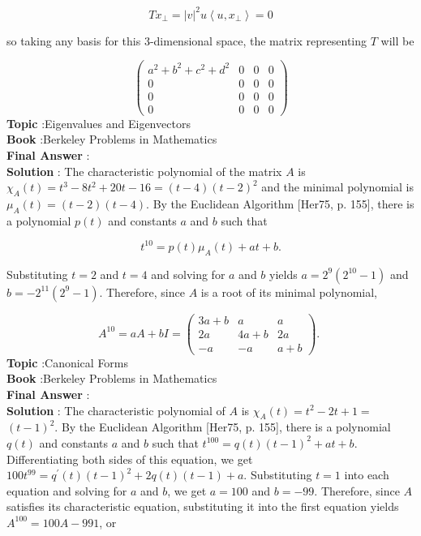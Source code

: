 \documentclass[10pt]{article}
\begin{document}
$$
T x_{\perp}=|v|^{2} u\left\langle u, x_{\perp}\right\rangle=0
$$

so taking any basis for this 3-dimensional space, the matrix representing $T$ will be

$$
\left(\begin{array}{cccc}
a^{2}+b^{2}+c^{2}+d^{2} & 0 & 0 & 0 \\
0 & 0 & 0 & 0 \\
0 & 0 & 0 & 0 \\
0 & 0 & 0 & 0
\end{array}\right)
$$
\textbf{Topic} :Eigenvalues and Eigenvectors \\
\textbf{Book} :Berkeley Problems in Mathematics\\
\textbf{Final Answer} :\\


\textbf{Solution} : The characteristic polynomial of the matrix $A$ is $\chi_{A}(t)=t^{3}-8 t^{2}+20 t-16=(t-4)(t-2)^{2}$ and the minimal polynomial is $\mu_{A}(t)=(t-2)(t-4)$. By the Euclidean Algorithm [Her75, p. 155], there is a polynomial $p(t)$ and constants $a$ and $b$ such that

$$
t^{10}=p(t) \mu_{A}(t)+a t+b .
$$

Substituting $t=2$ and $t=4$ and solving for $a$ and $b$ yields $a=2^{9}\left(2^{10}-1\right)$ and $b=-2^{11}\left(2^{9}-1\right)$. Therefore, since $A$ is a root of its minimal polynomial,

$$
A^{10}=a A+b I=\left(\begin{array}{ccc}
3 a+b & a & a \\
2 a & 4 a+b & 2 a \\
-a & -a & a+b
\end{array}\right) \text {. }
$$
\textbf{Topic} :Canonical Forms \\
\textbf{Book} :Berkeley Problems in Mathematics\\
\textbf{Final Answer} :\\


\textbf{Solution} : The characteristic polynomial of $A$ is $\chi_{A}(t)=t^{2}-2 t+1=$ $(t-1)^{2}$. By the Euclidean Algorithm [Her75, p. 155], there is a polynomial $q(t)$ and constants $a$ and $b$ such that $t^{100}=q(t)(t-1)^{2}+a t+b$. Differentiating both sides of this equation, we get $100 t^{99}=q^{\prime}(t)(t-1)^{2}+2 q(t)(t-1)+a$. Substituting $t=1$ into each equation and solving for $a$ and $b$, we get $a=100$ and $b=-99$. Therefore, since $A$ satisfies its characteristic equation, substituting it into the first equation yields $A^{100}=100 A-991$, or
\end{document}
